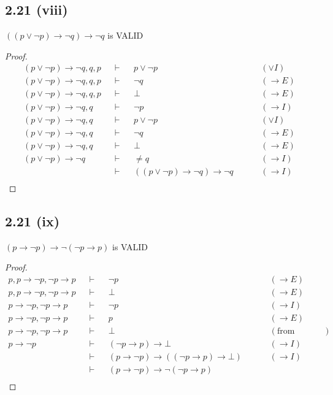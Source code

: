 \documentclass[12pt]{article}
\begin{document}
\subsection*{2.21 (viii)} 
$((p \vee \neg p) \rightarrow \neg q) \rightarrow \neg q$ is VALID
\begin{proof}
\begin{align*}
    (p \vee \neg p) \rightarrow \neg q, q, p &&\vdash&& p \vee \neg p && &&(\vee I)\\
    (p \vee \neg p) \rightarrow \neg q, q, p &&\vdash&& \neg q && &&(\rightarrow E) \\
    (p \vee \neg p) \rightarrow \neg q, q, p &&\vdash&& \bot && &&(\rightarrow E) \\
    (p \vee \neg p) \rightarrow \neg q, q &&\vdash&& \neg p && &&(\rightarrow I) \\
    (p \vee \neg p) \rightarrow \neg q, q &&\vdash&& p \vee \neg p && &&(\vee I) \\
    (p \vee \neg p) \rightarrow \neg q, q &&\vdash&& \neg q && &&(\rightarrow E) \\
    (p \vee \neg p) \rightarrow \neg q, q &&\vdash&& \bot && &&(\rightarrow E) \\
    (p \vee \neg p) \rightarrow \neg q &&\vdash&& \neq q && &&(\rightarrow I) \\
    &&\vdash&& ((p \vee \neg p) \rightarrow \neg q) \rightarrow \neg q && &&(\rightarrow I) \\
\end{align*}
\end{proof}

\subsection*{2.21 (ix)} 
$(p \rightarrow \neg p) \rightarrow \neg (\neg p \rightarrow p)$ is VALID
\begin{proof}
\begin{align*}
    p, p \rightarrow \neg p, \neg p \rightarrow p &&\vdash&& \neg p && &&(\rightarrow E) \\
    p, p \rightarrow \neg p, \neg p \rightarrow p &&\vdash&& \bot && &&(\rightarrow E) \\
    p \rightarrow \neg p, \neg p \rightarrow p &&\vdash&& \neg p && &&(\rightarrow I) \\
    p \rightarrow \neg p, \neg p \rightarrow p &&\vdash&& p && &&(\rightarrow E) \\
    p \rightarrow \neg p, \neg p \rightarrow p &&\vdash&& \bot && &&(\text{from previous two steps}) \\
    p \rightarrow \neg p &&\vdash&& (\neg p \rightarrow p) \rightarrow \bot && &&(\rightarrow I) \\
    &&\vdash&& (p \rightarrow \neg p) \rightarrow ((\neg p \rightarrow p) \rightarrow \bot) && &&(\rightarrow I) \\
    &&\vdash&& (p \rightarrow \neg p) \rightarrow \neg (\neg p \rightarrow p) && && \\
\end{align*}
\end{proof}
\end{document}
